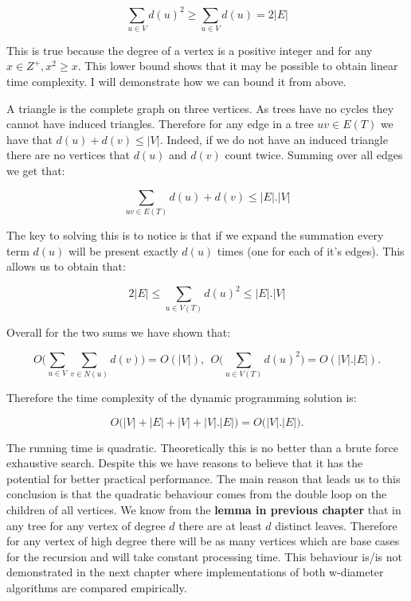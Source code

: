 $$ \sum_{u \in V}{d(u)^2} \ge \sum_{u \in V}{d(u)} = 2|E|$$

This is true because the degree of a vertex is a positive integer and for any $x \in Z^+, x^2 \ge x$. This lower bound shows that it may be possible to obtain linear time complexity. I will demonstrate how we can bound it from above. 

A triangle is the complete graph on three vertices. As trees have no cycles they cannot have induced triangles. Therefore for any edge in a tree $uv \in E(T)$ we have that $d(u) + d(v) \le |V|$. Indeed, if we do not have an induced triangle there are no vertices that $d(u)$ and $d(v)$ count twice. Summing over all edges we get that:

$$ \sum_{uv \in E(T)}{d(u) + d(v)} \le |E|.|V| $$

The key to solving this is to notice is that if we expand the summation every term $d(u)$ will be present exactly $d(u)$ times (one for each of it's edges). This allows us to obtain that:

$$ 2|E| \le \sum_{u \in V(T)}{d(u)^2} \le |E|.|V| $$

Overall for the two sums we have shown that:

$$ O\bigg( \sum_{u \in V}{\sum_{v \in N(u)}{d(v)}} \bigg) = O(|V|)  , ~~ O\bigg( \sum_{u \in V(T)}{d(u)^2} \bigg) = O(|V|.|E|).$$

Therefore the time complexity of the dynamic programming solution is:

$$ O\big( |V| + |E| + |V| + |V|.|E|  \big) = O\big(|V|.|E|\big).$$


The running time is quadratic. Theoretically this is no better than a brute force exhaustive search. Despite this we have reasons to believe that it has the potential for better practical performance. The main reason that leads us to this conclusion is that the quadratic behaviour comes from the double loop on the children of all vertices. We know from the \textbf{lemma in previous chapter}  that in any tree for any vertex of degree $d$ there are at least $d$ distinct leaves. Therefore for any vertex of high degree there will be as many vertices which are base cases for the recursion and will take constant processing time. This behaviour is/is not demonstrated in the next chapter where implementations of both w-diameter algorithms are compared empirically.


\cite{parikh1980adaptive}
